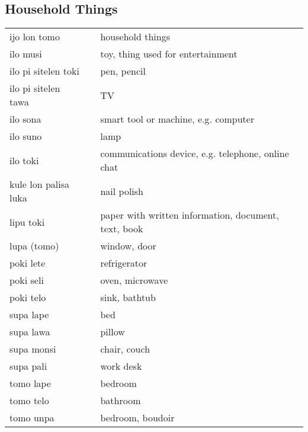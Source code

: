 \subsection{Household Things}
%
\begin{supertabular}{p{4,5cm}|ll}
    ijo lon tomo         &  & household things                                     \\
    ilo musi             &  & toy, thing used for entertainment                    \\
    ilo pi sitelen toki  &  & pen, pencil                                          \\
    ilo pi sitelen tawa  &  & TV                                                   \\
    ilo sona             &  & smart tool or machine, e.g. computer                 \\
    ilo suno             &  & lamp                                                 \\
    ilo toki             &  & communications device, e.g. telephone, online chat   \\
    kule lon palisa luka &  & nail polish                                          \\
    lipu toki            &  & paper with written information, document, text, book \\
    lupa (tomo)          &  & window, door                                         \\
    poki lete            &  & refrigerator                                         \\
    poki seli            &  & oven, microwave                                      \\
    poki telo            &  & sink, bathtub                                        \\
    supa lape            &  & bed                                                  \\
    supa lawa            &  & pillow                                               \\
    supa monsi           &  & chair, couch                                         \\
    supa pali            &  & work desk                                            \\
    tomo lape            &  & bedroom                                              \\
    tomo telo            &  & bathroom                                             \\
    tomo unpa            &  & bedroom, boudoir                                     \\
\end{supertabular} \\
%
%
